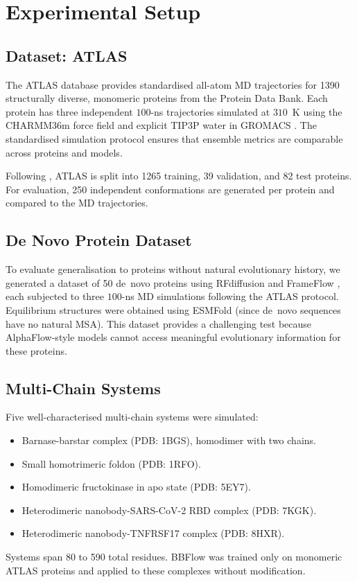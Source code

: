 \documentclass[12pt,a4paper]{article}
\begin{document}
\section{Experimental Setup}
\label{sec:experiments}

\subsection{Dataset: ATLAS}
\label{sec:atlas}

The ATLAS database \citep{vandermeersche2024atlas} provides standardised all-atom MD
trajectories for 1390 structurally diverse, monomeric proteins from the Protein Data Bank.
Each protein has three independent $100$-ns trajectories simulated at $310$~K using the
CHARMM36m force field \citep{huang2017} and explicit TIP3P water \citep{jorgensen1983}
in GROMACS \citep{abraham2015gromacs}.  The standardised simulation protocol ensures that
ensemble metrics are comparable across proteins and models.

Following \citet{jing2024alphaflow}, ATLAS is split into 1265 training, 39 validation,
and 82 test proteins.  For evaluation, 250 independent conformations are generated per
protein and compared to the MD trajectories.

\subsection{De Novo Protein Dataset}
\label{sec:denovo_data}

To evaluate generalisation to proteins without natural evolutionary history, we generated
a dataset of 50 de~novo proteins using RFdiffusion \citep{watson2023} and FrameFlow \citep{yim2023frameflow},
each subjected to three $100$-ns MD simulations following the ATLAS protocol.  Equilibrium
structures were obtained using ESMFold \citep{lin2023} (since de~novo sequences have no
natural MSA).  This dataset provides a challenging test because AlphaFlow-style models cannot
access meaningful evolutionary information for these proteins.

\subsection{Multi-Chain Systems}
\label{sec:multichain_data}

Five well-characterised multi-chain systems were simulated:
\begin{itemize}
  \item Barnase-barstar complex (PDB: 1BGS), homodimer with two chains.
  \item Small homotrimeric foldon (PDB: 1RFO).
  \item Homodimeric fructokinase in apo state (PDB: 5EY7).
  \item Heterodimeric nanobody-SARS-CoV-2 RBD complex (PDB: 7KGK).
  \item Heterodimeric nanobody-TNFRSF17 complex (PDB: 8HXR).
\end{itemize}
Systems span 80 to 590 total residues.  BBFlow was trained only on monomeric ATLAS proteins
and applied to these complexes without modification.
\end{document}
